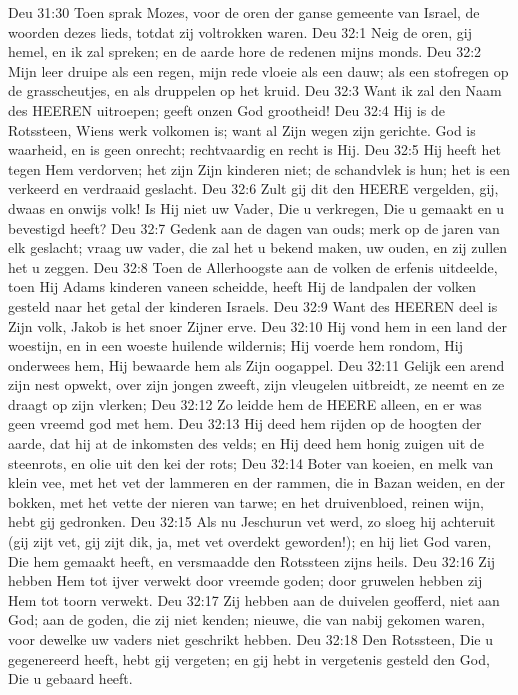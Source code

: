 Deu 31:30  Toen sprak Mozes, voor de oren der ganse gemeente van Israel, de woorden dezes lieds, totdat zij voltrokken waren.
Deu 32:1  Neig de oren, gij hemel, en ik zal spreken; en de aarde hore de redenen mijns monds.
Deu 32:2  Mijn leer druipe als een regen, mijn rede vloeie als een dauw; als een stofregen op de grasscheutjes, en als druppelen op het kruid.
Deu 32:3  Want ik zal den Naam des HEEREN uitroepen; geeft onzen God grootheid!
Deu 32:4  Hij is de Rotssteen, Wiens werk volkomen is; want al Zijn wegen zijn gerichte. God is waarheid, en is geen onrecht; rechtvaardig en recht is Hij.
Deu 32:5  Hij heeft het tegen Hem verdorven; het zijn Zijn kinderen niet; de schandvlek is hun; het is een verkeerd en verdraaid geslacht.
Deu 32:6  Zult gij dit den HEERE vergelden, gij, dwaas en onwijs volk! Is Hij niet uw Vader, Die u verkregen, Die u gemaakt en u bevestigd heeft?
Deu 32:7  Gedenk aan de dagen van ouds; merk op de jaren van elk geslacht; vraag uw vader, die zal het u bekend maken, uw ouden, en zij zullen het u zeggen.
Deu 32:8  Toen de Allerhoogste aan de volken de erfenis uitdeelde, toen Hij Adams kinderen vaneen scheidde, heeft Hij de landpalen der volken gesteld naar het getal der kinderen Israels.
Deu 32:9  Want des HEEREN deel is Zijn volk, Jakob is het snoer Zijner erve.
Deu 32:10  Hij vond hem in een land der woestijn, en in een woeste huilende wildernis; Hij voerde hem rondom, Hij onderwees hem, Hij bewaarde hem als Zijn oogappel.
Deu 32:11  Gelijk een arend zijn nest opwekt, over zijn jongen zweeft, zijn vleugelen uitbreidt, ze neemt en ze draagt op zijn vlerken;
Deu 32:12  Zo leidde hem de HEERE alleen, en er was geen vreemd god met hem.
Deu 32:13  Hij deed hem rijden op de hoogten der aarde, dat hij at de inkomsten des velds; en Hij deed hem honig zuigen uit de steenrots, en olie uit den kei der rots;
Deu 32:14  Boter van koeien, en melk van klein vee, met het vet der lammeren en der rammen, die in Bazan weiden, en der bokken, met het vette der nieren van tarwe; en het druivenbloed, reinen wijn, hebt gij gedronken.
Deu 32:15  Als nu Jeschurun vet werd, zo sloeg hij achteruit (gij zijt vet, gij zijt dik, ja, met vet overdekt geworden!); en hij liet God varen, Die hem gemaakt heeft, en versmaadde den Rotssteen zijns heils.
Deu 32:16  Zij hebben Hem tot ijver verwekt door vreemde goden; door gruwelen hebben zij Hem tot toorn verwekt.
Deu 32:17  Zij hebben aan de duivelen geofferd, niet aan God; aan de goden, die zij niet kenden; nieuwe, die van nabij gekomen waren, voor dewelke uw vaders niet geschrikt hebben.
Deu 32:18  Den Rotssteen, Die u gegenereerd heeft, hebt gij vergeten; en gij hebt in vergetenis gesteld den God, Die u gebaard heeft.
